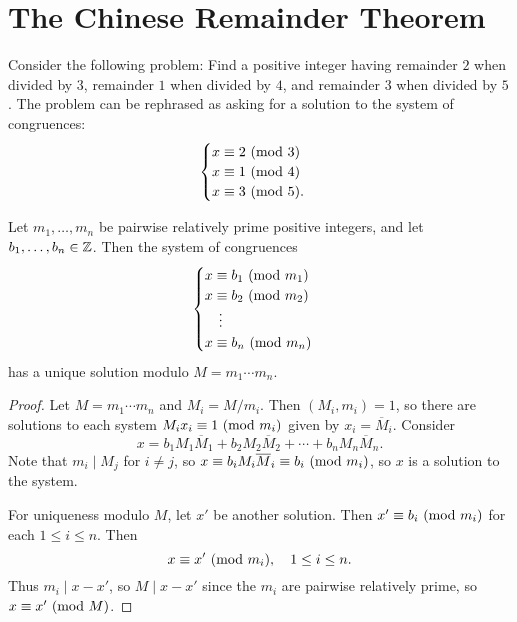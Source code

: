 \section{The Chinese Remainder Theorem}

\begin{example}\label{ex:crt-example}
  Consider the following problem:
  Find a positive integer having
  remainder $2$ when divided by $3$,
  remainder $1$ when divided by $4$,
  and remainder $3$ when divided by $5$.
  The problem can be rephrased as
  asking for a solution to the system
  of congruences:
  \[
    \begin{cases}
      x \equiv 2 \ (\mathrm{mod}\ 3) \\
      x \equiv 1 \ (\mathrm{mod}\ 4) \\
      x \equiv 3 \ (\mathrm{mod}\ 5).
    \end{cases}
  \]
\end{example}

\begin{theorem}
  Let $m_1, \dots, m_n$ be pairwise
  relatively prime positive integers,
  and let $b_1, \dots, b_n \in \mathbb{Z}$.
  Then the system of congruences
  \[
    \begin{cases}
      x \equiv b_1 \ (\mathrm{mod}\ m_1) \\
      x \equiv b_2 \ (\mathrm{mod}\ m_2) \\
      \quad \vdots \\
      x \equiv b_n \ (\mathrm{mod}\ m_n)
    \end{cases}
  \]
  has a unique solution modulo
  $M = m_1 \cdots m_n$.
\end{theorem}

\begin{proof}
  Let $M = m_1 \cdots m_n$ and
  $M_i = M / m_i$. Then
  $(M_i, m_i) = 1$, so there are solutions
  to each system
  $M_i x_i \equiv 1 \ (\mathrm{mod}\ m_i)$ given
  by $x_i = \overline{M}_i$. Consider
  \[
    x = b_1 M_1 \overline{M}_1
    + b_2 M_2 \overline{M}_2
    + \cdots
    + b_n M_n \overline{M}_n.
  \]
  Note that $m_i \mid M_j$ for
  $i \ne j$, so
  $x \equiv b_i M_i \overline{M}_i \equiv b_i \ (\mathrm{mod}\ m_i)$,
  so $x$ is a solution to the system.

  For uniqueness modulo $M$, let
  $x'$ be another solution. Then
  $x' \equiv b_i \ (\mathrm{mod}\ m_i)$ for
  each $1 \le i \le n$. Then
  \[
    x \equiv x' \ (\mathrm{mod}\ m_i), \quad
    1 \le i \le n.
  \]
  Thus $m_i \mid x - x'$, so
  $M \mid x - x'$ since the $m_i$
  are pairwise relatively prime,
  so $x \equiv x' \ (\mathrm{mod}\ M)$.
\end{proof}

